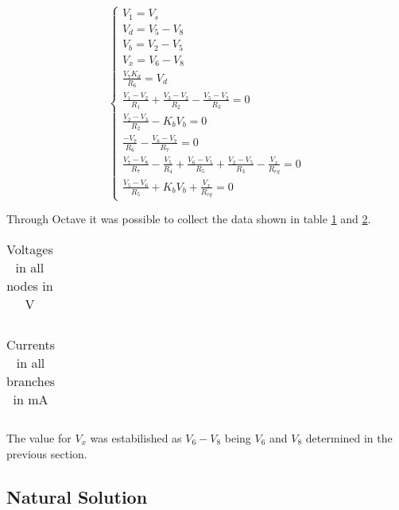 $$
\begin{cases} 
	V_1 = V_s \\ 
	V_d = V_5 -V_8 \\
	V_b = V_2 - V_5 \\
	V_x = V_6 - V_8 \\
	\frac{V_7 K_d}{R_6} = V_d \\ 
	\frac{V_1 - V_2}{R_1} + \frac{V_3 - V_2}{R_2} - \frac{V_5 - V_2}{R_3}  = 0 \\
	\frac{V_2 - V_3}{R_2} - K_b V_b = 0 \\
	\frac{-V_7}{R_6} -\frac{V_8 - V_7}{R_7} = 0 \\
	\frac{V_7 - V_8}{R_7} - \frac{V_5}{R_4} + \frac{V_6 - V_5}{R_5} + \frac{V_2 - V_5}{R_3} - \frac{V_x}{R_{eq}}= 0 \\
	\frac{V_5 - V_6}{R_5} + K_b V_b + \frac{V_x}{R_{eq}}= 0 
\label{system 2}
\end{cases}
$$



Through Octave it was possible to collect the data shown in table \ref{table2a} and \ref{table2b}.

\begin{table}[H]
    \centering
    \begin{tabular}{|c|c|}
    \hline
        
    \end{tabular}
    \caption{Voltages in all nodes in V}
    \label{table2a}
\end{table}


\begin{table}[H]
    \centering
    \begin{tabular}{|c|c|}
    \hline
        
    \end{tabular}
    \caption{Currents in all branches in mA}
    \label{table2b}
\end{table}




\par The value for $V_x$ was estabilished as $V_6 - V_8$ being $V_6$ and $V_8$ determined in the previous section.

\subsection{Natural Solution}
\paragraph{}

